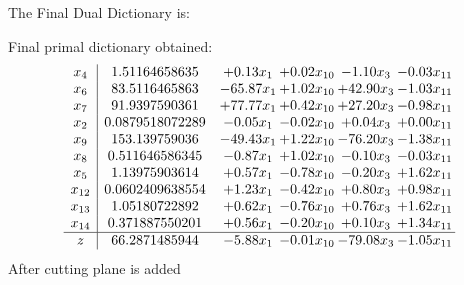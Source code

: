 \documentclass[8pt]{article}
\begin{document}
The Final Dual Dictionary is: 

 Final primal dictionary obtained: 
\[\begin{array}{c| c c@{\hskip 2pt} c@{\hskip 2pt} c@{\hskip 2pt} c@{\hskip 2pt} }
 x_{4}   &  1.51164658635 & +  0.13 x_{1} & +  0.02 x_{10} & -1.10 x_{3} & -0.03 x_{11}\\
 x_{6}   &  83.5116465863 & -65.87 x_{1} & +  1.02 x_{10} & + 42.90 x_{3} & -1.03 x_{11}\\
 x_{7}   &  91.9397590361 & + 77.77 x_{1} & +  0.42 x_{10} & + 27.20 x_{3} & -0.98 x_{11}\\
 x_{2}   &  0.0879518072289 & -0.05 x_{1} & -0.02 x_{10} & +  0.04 x_{3} & +  0.00 x_{11}\\
 x_{9}   &  153.139759036 & -49.43 x_{1} & +  1.22 x_{10} & -76.20 x_{3} & -1.38 x_{11}\\
 x_{8}   &  0.511646586345 & -0.87 x_{1} & +  1.02 x_{10} & -0.10 x_{3} & -0.03 x_{11}\\
 x_{5}   &  1.13975903614 & +  0.57 x_{1} & -0.78 x_{10} & -0.20 x_{3} & +  1.62 x_{11}\\
 x_{12}   &  0.0602409638554 & +  1.23 x_{1} & -0.42 x_{10} & +  0.80 x_{3} & +  0.98 x_{11}\\
 x_{13}   &  1.05180722892 & +  0.62 x_{1} & -0.76 x_{10} & +  0.76 x_{3} & +  1.62 x_{11}\\
 x_{14}   &  0.371887550201 & +  0.56 x_{1} & -0.20 x_{10} & +  0.10 x_{3} & +  1.34 x_{11}\\
\hline
z    &  66.2871485944 & -5.88 x_{1} & -0.01 x_{10} & -79.08 x_{3} & -1.05 x_{11}\\
\end{array}\]
 After cutting plane is added 
\end{document}
